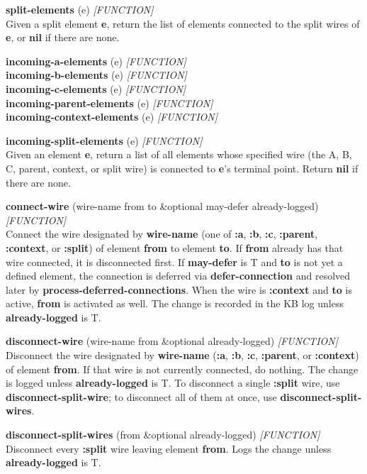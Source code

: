 \documentclass[titlepage,twoside,openright,11pt]{article}
\begin{document}
\textbf{split-elements} (e) \emph{{[}FUNCTION{]}}\\
Given a split element \textbf{e}, return the list of elements connected
to the split wires of \textbf{e}, or \textbf{nil} if there are none.

\textbf{incoming-a-elements} (e) \emph{{[}FUNCTION{]}}\\
\textbf{incoming-b-elements} (e) \emph{{[}FUNCTION{]}}\\
\textbf{incoming-c-elements} (e) \emph{{[}FUNCTION{]}}\\
\textbf{incoming-parent-elements} (e) \emph{{[}FUNCTION{]}\\
}\textbf{incoming-context-elements} (e) \emph{{[}FUNCTION{]}}

\textbf{incoming-split-elements} (e) \emph{{[}FUNCTION{]}}\\
Given an element \textbf{e}, return a list of all elements whose
specified wire (the A, B, C, parent, context, or split wire) is
connected to \textbf{e}'s terminal point. Return \textbf{nil} if there
are none.

\textbf{connect-wire} (wire-name from to \&optional may-defer
already-logged) \emph{{[}FUNCTION{]}}\\
Connect the wire designated by \textbf{wire-name} (one of \textbf{:a},
\textbf{:b}, \textbf{:c}, \textbf{:parent}, \textbf{:context}, or
\textbf{:split}) of element \textbf{from} to element \textbf{to}. If
\textbf{from} already has that wire connected, it is disconnected
first. If \textbf{may-defer} is T and \textbf{to} is not yet a defined
element, the connection is deferred via \textbf{defer-connection} and
resolved later by \textbf{process-deferred-connections}. When the wire
is \textbf{:context} and \textbf{to} is active, \textbf{from} is
activated as well. The change is recorded in the KB log unless
\textbf{already-logged} is T.

\textbf{disconnect-wire} (wire-name from \&optional already-logged)
\emph{{[}FUNCTION{]}}\\
Disconnect the wire designated by \textbf{wire-name} (\textbf{:a},
\textbf{:b}, \textbf{:c}, \textbf{:parent}, or \textbf{:context}) of
element \textbf{from}. If that wire is not currently connected, do
nothing. The change is logged unless \textbf{already-logged} is T. To
disconnect a single \textbf{:split} wire, use
\textbf{disconnect-split-wire}; to disconnect all of them at once, use
\textbf{disconnect-split-wires}.

\textbf{disconnect-split-wires} (from \&optional already-logged)
\emph{{[}FUNCTION{]}}\\
Disconnect every \textbf{:split} wire leaving element \textbf{from}.
Logs the change unless \textbf{already-logged} is T.
\end{document}
